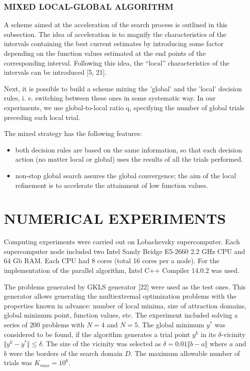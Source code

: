 \documentclass{aip-cp}
\begin{document}
\subsubsection{MIXED LOCAL-GLOBAL ALGORITHM}
A scheme aimed at the acceleration of the search process is outlined in this subsection. The idea of acceleration is to magnify the characteristics of the intervals containing the best current estimates by introducing some factor depending on the function values estimated at the end points of the corresponding interval. Following this idea, the “local” characteristics of the intervals can be introduced [5, 21].

Next, it is possible to build a scheme mixing the 'global' and the 'local' decision rules, i. e. switching between these ones in some systematic way. In our experiments, we use global-to-local ratio q, specifying the number of global trials preceding each local trial.

The mixed strategy has the following features:

\begin{itemize}
\item both decision rules are based on the same information, so that each decision action (no matter local or global) uses the results of all the trials performed.
\item non-stop global search assures the global convergence; the aim of the local refinement is to accelerate the attainment of low function values.
\end{itemize}

\section{NUMERICAL EXPERIMENTS}
Computing experiments were carried out on Lobachevsky supercomputer. Each supercomputer node included two Intel Sandy Bridge E5-2660 2.2 GHz CPU and 64 Gb RAM. Each CPU had 8 cores (total 16 cores per a node). For the implementation of the parallel algorithm, Intel C++ Compiler 14.0.2 was used.

The problems generated by GKLS generator [22] were used as the test ones. This generator allows generating the multiextremal optimization problems with the properties known in advance: number of local minima, size of attraction domains, global minimum point, function values, etc. The experiment included solving a series of 200 problems with $N=4$ and $N=5$. The global minimum $y^*$ was considered to be found, if the algorithm generates a trial point $y^k$ in its $\delta$-vicinity $\Vert y^k-y^*\Vert\leqslant \delta$. The size of the vicinity was selected as $\delta=0.01\Vert b- a\Vert$ where $a$ and $b$ were the borders of the search domain $D$. The maximum allowable number of trials was $K_{max} = 10^6$.
\end{document}
